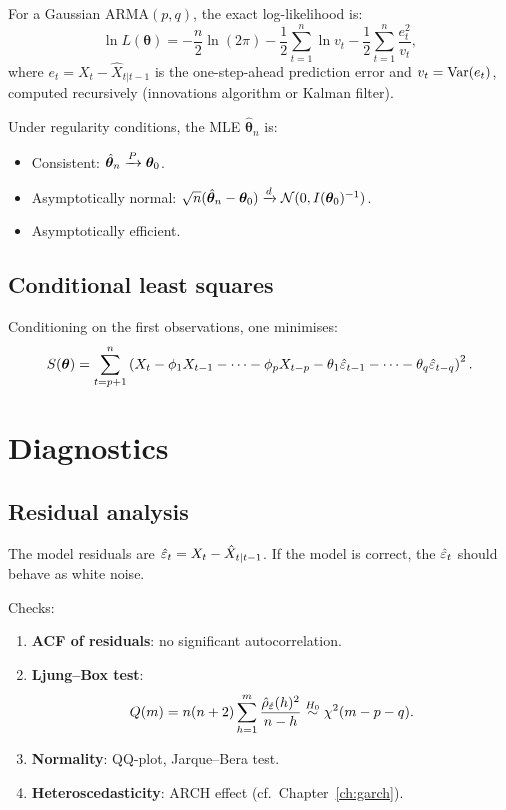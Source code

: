 \begin{definition}
For a Gaussian ARMA$(p,q)$, the exact log-likelihood is:
\[
\ln L(\bm\theta) = -\frac{n}{2}\ln(2\pi) - \frac{1}{2}\sum_{t=1}^n\ln v_t - \frac{1}{2}\sum_{t=1}^n\frac{e_t^2}{v_t},
\]
where $e_t = X_t - \hat{X}_{t|t-1}$ is the one-step-ahead prediction error and $v_t=\operatorname{Var}(e_t)$, computed recursively (innovations algorithm or Kalman filter).
\end{definition}

\begin{theorem}
Under regularity conditions, the MLE $\hat{\bm\theta}_n$ is:
\begin{itemize}
\item Consistent: $\hat{\bm\theta}_n\xrightarrow{P}\bm\theta_0$.
\item Asymptotically normal: $\sqrt{n}(\hat{\bm\theta}_n-\bm\theta_0)\xrightarrow{d}\mathcal{N}(0,I(\bm\theta_0)^{-1})$.
\item Asymptotically efficient.
\end{itemize}
\end{theorem}

\subsection{Conditional least squares}

\begin{definition}
Conditioning on the first observations, one minimises:
\[
S(\bm\theta) = \sum_{t=p+1}^n\left(X_t - \phi_1 X_{t-1}-\cdots - \phi_p X_{t-p} - \theta_1\hat{\varepsilon}_{t-1}-\cdots-\theta_q\hat{\varepsilon}_{t-q}\right)^2.
\]
\end{definition}

\section{Diagnostics}

\subsection{Residual analysis}

\begin{definition}
The model residuals are $\hat{\varepsilon}_t = X_t - \hat{X}_{t|t-1}$. If the model is correct, the $\hat{\varepsilon}_t$ should behave as white noise.
\end{definition}

Checks:
\begin{enumerate}
\item \textbf{ACF of residuals}: no significant autocorrelation.
\item \textbf{Ljung--Box test}:
\[
Q(m) = n(n+2)\sum_{h=1}^m\frac{\hat{\rho}_{\hat{\varepsilon}}(h)^2}{n-h} \stackrel{H_0}{\sim}\chi^2(m-p-q).
\]
\item \textbf{Normality}: QQ-plot, Jarque--Bera test.
\item \textbf{Heteroscedasticity}: ARCH effect (cf.\ Chapter~\ref{ch:garch}).
\end{enumerate}

